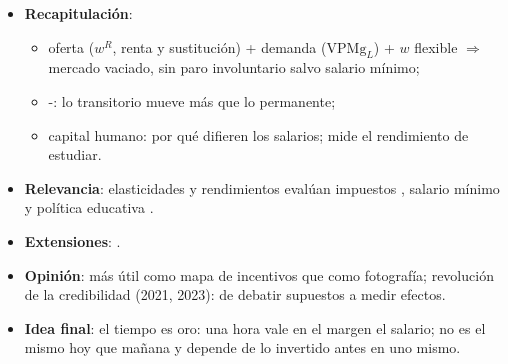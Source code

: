\documentclass{article}
\begin{document}
\begin{columnas}
\begin{itemize}
\item \textbf{Recapitulación}:
  \begin{itemize}
  \item oferta ($w^R$, renta y sustitución) + demanda ($\mathrm{VPMg}_L$) + $w$ flexible $\Rightarrow$ mercado vaciado, sin paro involuntario salvo salario mínimo;
  \item {}-: lo transitorio mueve más que lo permanente;
  \item capital humano: por qué difieren los salarios;  mide el rendimiento de estudiar.
  \end{itemize}
\item \textbf{Relevancia}: elasticidades y rendimientos evalúan impuestos , salario mínimo  y política educativa .
\item \textbf{Extensiones}:     .
\item \textbf{Opinión}: más útil como mapa de incentivos que como fotografía; revolución de la credibilidad (2021, 2023): de debatir supuestos a medir efectos.
\item \textbf{Idea final}: el tiempo es oro: una hora vale en el margen el salario; no es el mismo hoy que mañana y depende de lo invertido antes en uno mismo.
\end{itemize}


\end{columnas}
\end{document}
